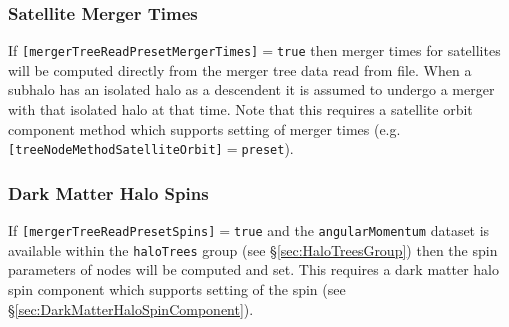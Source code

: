 \subsubsection{Satellite Merger Times}

If {\tt [mergerTreeReadPresetMergerTimes]}$=${\tt true} then merger times for satellites will be computed directly from the merger tree data read from file. When a subhalo has an isolated halo as a descendent it is assumed to undergo a merger with that isolated halo at that time. Note that this requires a satellite orbit component method which supports setting of merger times (e.g. {\tt [treeNodeMethodSatelliteOrbit]}$=${\tt preset}).

\subsubsection{Dark Matter Halo Spins}

If {\tt [mergerTreeReadPresetSpins]}$=${\tt true} and the {\tt angularMomentum} dataset is available within the {\tt haloTrees} group (see \S\ref{sec:HaloTreesGroup}) then the spin parameters of nodes will be computed and set. This requires a dark matter halo spin component which supports setting of the spin (see \S\ref{sec:DarkMatterHaloSpinComponent}).
